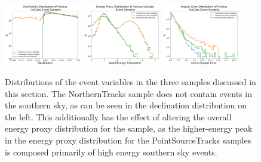 \begin{figure}[ht!]
\centering
\includegraphics[width=0.3\textwidth]{figs/sample_decs.png}
\includegraphics[width=0.3\textwidth]{figs/sample_es.png}
\includegraphics[width=0.3\textwidth]{figs/sample_sigmas.png}
\caption{Distributions of the event variables in the three samples discussed in this section. The NorthernTracks sample does not contain events in the southern sky, as can be seen in the declination distribution on the left. This additionally has the effect of altering the overall energy proxy distribution for the sample, as the higher-energy peak in the energy proxy distribution for the PointSourceTracks samples is composed primarily of high energy southern sky events. }
\label{fig:sampledists}
\end{figure}

